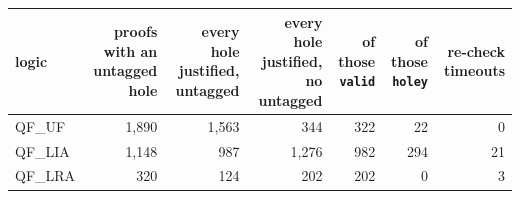 \begin{tabular}{lrrrrrr}
\toprule
logic & proofs with an untagged hole & every hole justified, untagged & every hole justified, no untagged & of those \texttt{valid} & of those \texttt{holey} & re-check timeouts \\
\midrule
QF\_UF & 1,890 & 1,563 & 344 & 322 & 22 & 0 \\
QF\_LIA & 1,148 & 987 & 1,276 & 982 & 294 & 21 \\
QF\_LRA & 320 & 124 & 202 & 202 & 0 & 3 \\
\bottomrule
\end{tabular}
